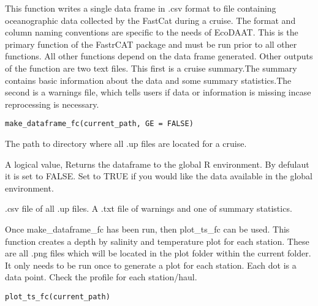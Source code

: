 \documentclass[a4paper]{book}
\begin{document}
%
\begin{Description}\relax
This function writes a single data frame in .csv format to file
containing oceanographic data collected by the FastCat during a cruise.
The format and column naming conventions are specific to the needs of EcoDAAT.
This is the primary function of the FastrCAT package and must be run prior to
all other functions. All other functions depend on the data frame generated.
Other outputs of the function are two text files. This first is a cruise
summary.The summary contains basic information about the data and some summary
statistics.The second is a warnings file, which tells users if data or
information is missing incase reprocessing is necessary.
\end{Description}
%
\begin{Usage}
\begin{verbatim}
make_dataframe_fc(current_path, GE = FALSE)
\end{verbatim}
\end{Usage}
%
\begin{Arguments}
\begin{ldescription}
\item[\code{current\_path}] The path to directory where all .up files
are located for a cruise.

\item[\code{GE}] A logical value, Returns the dataframe to the global R environment.
By defulaut it is set to FALSE. Set to TRUE if you would like the data
available in the global environment.
\end{ldescription}
\end{Arguments}
%
\begin{Value}
.csv file of all .up files. A .txt file of warnings and one
of summary statistics.
\end{Value}
%
\begin{Description}\relax
Once make\_dataframe\_fc has been run, then plot\_ts\_fc
can be used. This function creates a depth by salinity and temperature
plot for each station. These are all .png files which will be located
in the plot folder within the current folder. It only needs to be run
once to generate a plot for each station. Each dot is a data point.
Check the profile for each station/haul.
\end{Description}
%
\begin{Usage}
\begin{verbatim}
plot_ts_fc(current_path)
\end{verbatim}
\end{Usage}
\end{document}
